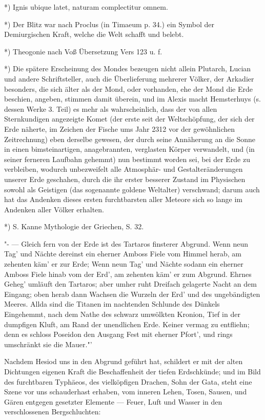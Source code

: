 \documentclass[a4paper, 11pt, oneside, polutonikogreek, german]{article}
\begin{document}
*) Ignis ubique latet, naturam complectitur omnem.

*) Der Blitz war nach Proclus (in Timaeum p. 34.) ein Symbol der Demiurgischen Kraft, welche die Welt schafft und belebt.

*) Theogonie nach Voß Übersetzung Vers 123 u. f.

*) Die spätere Erscheinung des Mondes bezeugen nicht allein Plutarch, Lucian und andere Schriftsteller, auch die Überlieferung mehrerer Völker, der Arkadier besonders, die sich älter als der Mond, oder vorhanden, ehe der Mond die Erde beschien, angeben, stimmen damit überein, und im Alexis macht Hemsterhuys (s. dessen Werke 3. Teil) es mehr als wahrscheinlich, dass der von allen Sternkundigen angezeigte Komet (der erste seit der Weltschöpfung, der sich der Erde näherte, im Zeichen der Fische ums Jahr 2312 vor der gewöhnlichen Zeitrechnung) eben derselbe gewesen, der durch seine Annäherung an die Sonne in einen bimsteinartigen, anagebrannten, verglasten Körper verwandelt, und (in seiner ferneren Laufbahn gehemmt) nun bestimmt worden sei, bei der Erde zu verbleiben, wodurch unbezweifelt alle Atmosphär- und Gestalteränderungen unserer Erde geschahen, durch die ihr erster besserer Zustand im Physischen sowohl als Geistigen (das sogenannte goldene Weltalter) verschwand; darum auch hat das Andenken dieses ersten furchtbarsten aller Meteore sich so lange im Andenken aller Völker erhalten.

*) S. Kanne Mythologie der Griechen, S. 32.

"- --- Gleich fern von der Erde ist des Tartaros finsterer Abgrund. Wenn neun Tag' und Nächte dereinst ein eherner Amboss Fiele vom Himmel herab, am zehenten käm' er zur Erde; Wenn neun Tag' und Nächte sodann ein eherner Amboss Fiele hinab vom der Erd', am zehenten käm' er zum Abgrund. Ehrnes Geheg' umläuft den Tartaros; aber umher ruht Dreifach gelagerte Nacht an dem Eingang; oben herab dann Wachsen die Wurzeln der Erd' und des ungebändigten Meeres. Allda sind die Titanen im nachtenden Schlunde des Dünkels Eingehemmt, nach dem Nathe des schwarz umwölkten Kronion, Tief in der dumpfigen Kluft, am Rand der unendlichen Erde. Keiner vermag zu entfliehn; denn es schloss Poseidon den Ausgang Fest mit eherner Pfort', und rings umschränkt sie die Mauer."'

Nachdem Hesiod uns in den Abgrund geführt hat, schildert er mit der alten Dichtungen eigenen Kraft die Beschaffenheit der tiefen Erdschkünde; und im Bild des furchtbaren Typhäeos, des vielköpfigen Drachen, Sohn der Gata, steht eine Szene vor uns schauderhast erhaben, vom inneren Lehen, Tosen, Sausen, und Gären entgegen gesetzter Elemente --- Feuer, Luft und Wasser in den verschlossenen Bergschluchten:
\end{document}

